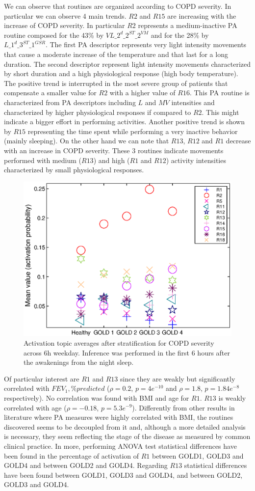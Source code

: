 We can observe that routines are organized according to COPD severity. In particular we can observe 4 main trends. $R2$ and $R15$ are increasing with the increase of COPD severity. In particular $R2$ represents a medium-inactive PA routine composed for the 43\% by $VL\_2^{d}\_2^{ST}\_2^{VM}$ and for the 28\% by $L\_1^{d}\_3^{ST}\_1^{GSR}$. The first PA descriptor represents very light intensity movements that cause a moderate increase of the temperature and that last for a long duration. The second descriptor represent light intensity movements characterized by short duration and a high physiological response (high body temperature). The positive trend is interrupted in the most severe group of patients that compensate a smaller value for $R2$ with a higher value of $R16$. This PA routine is characterized from PA descriptors including $L$ and $MV$ intensities and characterized by higher physiological responses if compared to $R2$. This might indicate a bigger effort in performing activities.
Another positive trend is shown by $R15$ representing the time spent while performing a very inactive behavior (mainly sleeping).
On the other hand we can note that $R13$, $R12$ and $R1$ decrease with an increase in COPD severity. These 3 routines indicate movements performed with medium ($R13$) and high ($R1$ and $R12$) activity intensities characterized by small physiological responses.
%
\begin{figure}[ht]
  \centering
  \includegraphics[width=.45\textwidth]{figure/eps/figure_7_trend_all_weekday.eps}
  \caption[]{Activation topic averages after stratification for COPD severity across 6h weekday. Inference was performed in the first 6 hours after the awakenings from the night sleep.}
  \label{fig:7_mean}
\end{figure}
Of particular interest are $R1$ and $R13$ since they are weakly but significantly correlated with $FEV_{1},\%predicted$ ($\rho=0.2$, $p=4e^{-10}$ and $\rho=1.8$, $p=1.84e^{-8}$ respectively). No correlation was found with BMI and age for $R1$. $R13$ is weakly correlated with age ($\rho=-0.18$, $p=5.3e^{-9}$). Differently from other results in literature where PA measures were highly correlated with BMI, the routines discovered seems to be decoupled from it and, although a more detailed analysis is necessary, they seem reflecting the stage of the disease as measured by common clinical practice.
In more, performing ANOVA test statistical differences have been found in the percentage of activation of $R1$ between GOLD1, GOLD3 and GOLD4 and between GOLD2 and GOLD4. Regarding $R13$ statistical differences have been found between GOLD1, GOLD3 and GOLD4, and between GOLD2, GOLD3 and GOLD4.

